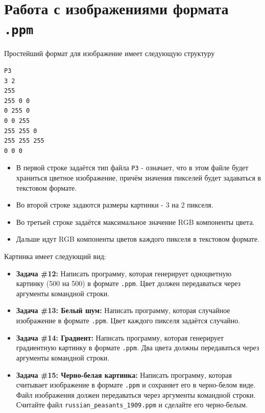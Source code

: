 \documentclass{article}
\begin{document}
\section*{Работа с изображениями формата \texttt{.ppm}}
Простейший формат для изображение имеет следующую структуру
\begin{verbatim}
P3
3 2
255
255 0 0 
0 255 0  
0 0 255 
255 255 0 
255 255 255 
0 0 0
\end{verbatim}
\begin{itemize}
\item В первой строке задаётся тип файла \texttt{P3} - означает, что в этом файле будет храниться цветное изображение, причём значения пикселей будет задаваться в текстовом формате.
\item Во второй строке задаются размеры картинки - 3 на 2 пикселя.
\item Во третьей строке задаётся максимальное значение RGB компоненты цвета.
\item Дальше идут RGB компоненты цветов каждого пикселя в текстовом формате.
\end{itemize}
Картинка имеет следующий вид:

\begin{itemize}
\item \textbf{Задача \#12:} Написать программу, которая генерирует одноцветную картинку (500 на 500) в формате \texttt{.ppm}. Цвет должен передаваться через аргументы командной строки.
\item \textbf{Задача \#13: Белый шум:} Написать программу, которая случайное изображение в формате \texttt{.ppm}. Цвет каждого пикселя задаётся случайно.
\item \textbf{Задача \#14: Градиент:} Написать программу, которая генерирует градиентную картинку в формате \texttt{.ppm}. Два цвета должны передаваться через аргументы командной строки.
\item \textbf{Задача \#15: Черно-белая картинка:} Написать программу, которая считывает изображение в формате \texttt{.ppm} и сохраняет его в черно-белом виде. Файл изображения должен передаваться через аргументы командной строки. Считайте файл \texttt{russian\_peasants\_1909.ppm} и сделайте его черно-белым.
\end{itemize}
\end{document}
